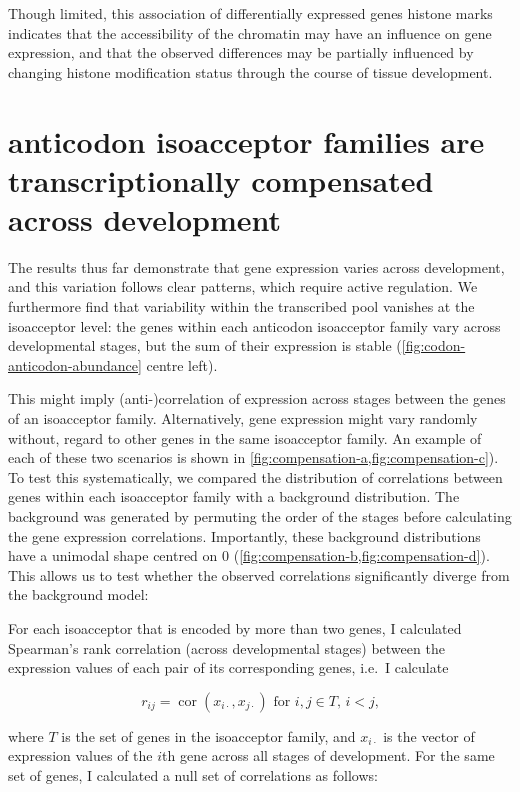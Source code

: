 Though limited, this association of differentially expressed \trna genes histone
marks indicates that the accessibility of the chromatin may have an influence on
\trna gene expression, and that the observed differences may be partially
influenced by changing histone modification status through the course of tissue
development.

\section{ anticodon isoacceptor families are transcriptionally
compensated across development}

The results thus far demonstrate that \trna gene expression varies across
development, and this variation follows clear patterns, which require active
regulation. We furthermore find that variability within the transcribed
\trna pool vanishes at the isoacceptor level: the \trna genes within each
anticodon isoacceptor family vary across developmental stages, but the sum of
their expression is stable (\cref{fig:codon-anticodon-abundance} centre left).

This might imply (anti-)correlation of expression across stages between the
genes of an isoacceptor family. Alternatively, \trna gene expression might vary
randomly without, regard to other \trna genes in the same isoacceptor family. An
example of each of these two scenarios is shown in
\cref{fig:compensation-a,fig:compensation-c}). To test this systematically, we
compared the distribution of correlations between genes within each isoacceptor
family with a background distribution. The background was generated by permuting
the order of the stages before calculating the \trna gene expression
correlations. Importantly, these background distributions have a unimodal shape
centred on \num{0} (\cref{fig:compensation-b,fig:compensation-d}). This allows
us to test whether the observed correlations significantly diverge from the
background model:

For each isoacceptor that is encoded by more than two \trna genes, I calculated
Spearman’s rank correlation (across developmental stages) between the expression
values of each pair of its corresponding \trna genes, i.e.\ I calculate

\begin{equation}
    r_{ij} = \operatorname{cor}(x_{i\cdot}, x_{j\cdot}) \text{\ for \(i, j \in
        T\), \(i < j\),}
\end{equation}

where \(T\) is the set of \trna genes in the isoacceptor family, and
\(x_{i\cdot}\) is the vector of expression values of the \(i\)th \trna gene
across all stages of development. For the same set of genes, I calculated a
null set of correlations as follows:

